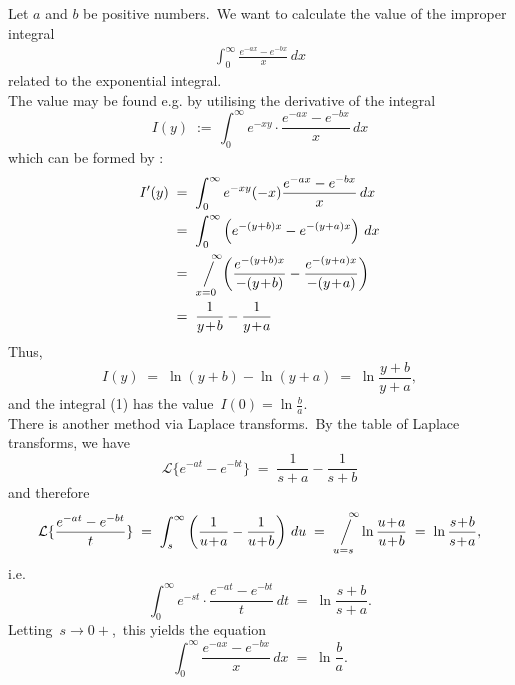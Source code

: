 \documentclass[12pt]{article}
\newcommand{\sijoitus}[2]%
{\operatornamewithlimits{\Big/}_{\!\!\!#1}^{\,#2}}
\begin{document}
Let $a$ and $b$ be positive numbers.\, We want to calculate the value of the improper integral
\begin{align}
\int_0^\infty\frac{e^{-ax}-e^{-bx}}{x}\,dx
\end{align}
related to the exponential integral.\\

The value may be found e.g. by utilising the derivative of the integral
$$I(y) \;:=\, \int_0^\infty e^{-xy}\!\cdot\!\frac{e^{-ax}-e^{-bx}}{x}\,dx$$
which can be formed by :
\begin{align*}
I'(y) & \;=\; \int_0^\infty e^{-xy}(-x)\frac{e^{-ax}-e^{-bx}}{x}\,dx\\
      & \;=\; \int_0^\infty\left(e^{-(y+b)x}-e^{-(y+a)x}\right)\,dx\\
      & \;=\; \sijoitus{x=0}{\quad\infty}\!\left(\frac{e^{-(y+b)x}}{-(y\!+\!b)}-\frac{e^{-(y+a)x}}{-(y\!+\!a)}\right)\\
      & \;=\; \frac{1}{y\!+\!b}-\frac{1}{y\!+\!a}
\end{align*}
Thus,
$$I(y) \;=\; \ln(y\!+\!b)-\ln(y\!+\!a) \;=\; \ln\frac{y\!+\!b}{y\!+\!a},$$
and the integral (1) has the value\, $\displaystyle I(0) = \ln\frac{b}{a}$.\\

There is another method via Laplace transforms.\, By the table of Laplace transforms, we have
$$\mathcal{L}\{e^{-at}-e^{-bt}\} \;=\; \frac{1}{s\!+\!a}-\frac{1}{s\!+\!b}$$
and therefore
$$\mathcal{L}\{\frac{e^{-at}-e^{-bt}}{t}\} \;=\; \int_s^\infty\left(\frac{1}{u\!+\!a}-\frac{1}{u\!+\!b}\right)\,du 
\;=\; \sijoitus{u=s}{\quad\infty}\ln\frac{u\!+\!a}{u\!+\!b} \;=\; \ln\frac{s\!+\!b}{s\!+\!a},$$
i.e.
$$\int_0^\infty e^{-st}\!\cdot\!\frac{e^{-at}-e^{-bt}}{t}\,dt \;=\; \ln\frac{s\!+\!b}{s\!+\!a}.$$
Letting\, $s \to 0+$,\, this yields the equation
$$\int_0^\infty\frac{e^{-ax}-e^{-bx}}{x}\,dx \;=\; \ln\frac{b}{a}.$$

\end{document}

